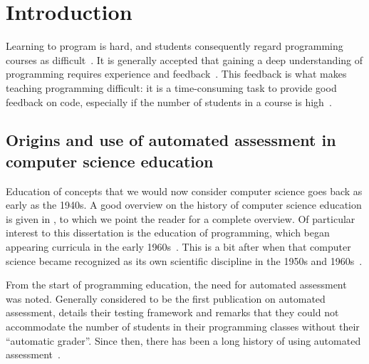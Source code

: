 \documentclass[./main]{subfiles}
\begin{document}
\chapter{Introduction}\label{ch:introduction}

Learning to program is hard, and students consequently regard programming courses as difficult~\autocite{robinsLearningTeachingProgramming2003,simoesNatureProgrammingExercises2020}.
It is generally accepted that gaining a deep understanding of programming requires experience and feedback~\autocite{gomesEnvironmentImproveProgramming2007}.
This feedback is what makes teaching programming difficult: it is a time-consuming task to provide good feedback on code, especially if the number of students in a course is high~\autocite{zavalaUseSemanticbasedAIG2018,staubitzRepositoryOpenAutogradable2017,queirosPexilProgrammingExercises2011,pirttinenCrowdsourcingProgrammingAssignments2018,gulwaniFeedbackGenerationPerformance2014,tangDatadrivenTestCase2016}.

\section{Origins and use of automated assessment in computer science education}\label{sec:automated-assessment-in-computer-science-education}

Education of concepts that we would now consider computer science goes back as early as the 1940s.
A good overview on the history of computer science education is given in \textcite{tedreChangingAimsComputing2018}, to which we point the reader for a complete overview.
Of particular interest to this dissertation is the education of programming, which began appearing curricula in the early 1960s~\autocite{simonEmergenceComputingEducation2015}.
This is a bit after when that computer science became recognized as its own scientific discipline in the 1950s and 1960s~\autocite{hopcroftComputerScienceEmergence1987,atchisonComputerScienceNew1971,gornComputerInformationSciences1963,knuthComputerScienceIts1974,denningScienceComputerScience2013}.

From the start of programming education, the need for automated assessment was noted.
Generally considered to be the first publication on automated assessment, \textcite{hollingsworthAutomaticGradersProgramming1960} details their testing framework and remarks that they could not accommodate the number of students in their programming classes without their ``automatic grader''.
Since then, there has been a long history of using automated assessment~\autocite{ala-mutkaSurveyAutomatedAssessment2005,douceAutomaticTestbasedAssessment2005,ihantolaReviewRecentSystems2010,paivaAutomatedAssessmentComputer2022,combefisAutomatedCodeAssessment2022,nayakAutomatedAssessmentTools2022,messerAutomatedGradingFeedback2024}.
\end{document}
